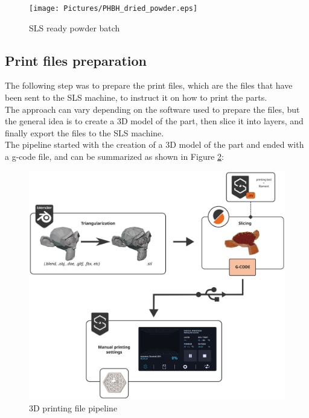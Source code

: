 \documentclass[a4paper]{article}
\begin{document}
                  \begin{figure}[ht]
                      \centering
                      \texttt{[image: Pictures/PHBH\_dried\_powder.eps]}
                      \caption{SLS ready powder batch}
                      \label{fig:PHBH_collected_powder}
                      
                  \end{figure}
  
          \subsection{Print files preparation\label{Print_files_preparation}}
  
          The following step was to prepare the print files, which are the files that have been sent to the SLS machine, 
          to instruct it on how to print the parts. \\
  
          The approach can vary depending on the software used to prepare the files, but the general idea is to 
          create a 3D model of the part, then slice it into layers, and finally export the files to the SLS machine. \\
  
          The pipeline started with the creation of a 3D model of the part and ended with a g-code file, and can 
          be summarized as shown in Figure \ref{fig:3dprint_file_pipeline_scheme}: 
          
                  \begin{figure}[ht]
                      \centering 
                      \includegraphics[width=\textwidth]{Pictures/3dprint_file_pipeline_scheme.eps}
                      \caption{3D printing file pipeline}
                      \label{fig:3dprint_file_pipeline_scheme}
                  \end{figure}
  
\end{document}
